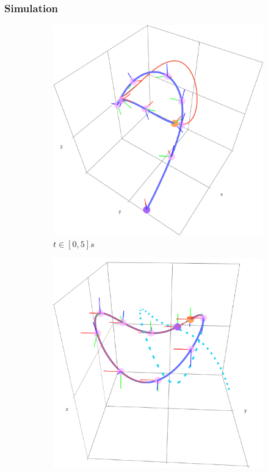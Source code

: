 \subsubsection{Simulation}
\begin{figure}[ht!]
    \centering
    \begin{subfigure}[b]{0.32\textwidth}
        \centering
        \includegraphics[width=\textwidth]{figures/vf_automatica_1.pdf} %
        \caption{$t\in[0, 5]s$}
        \label{fig:vfplot-first}
    \end{subfigure}
    \hfill
    \begin{subfigure}[b]{0.32\textwidth}
        \centering
        \includegraphics[width=\textwidth]{figures/vf_automatica_2.pdf} %

\end{subfigure}
\end{figure}
